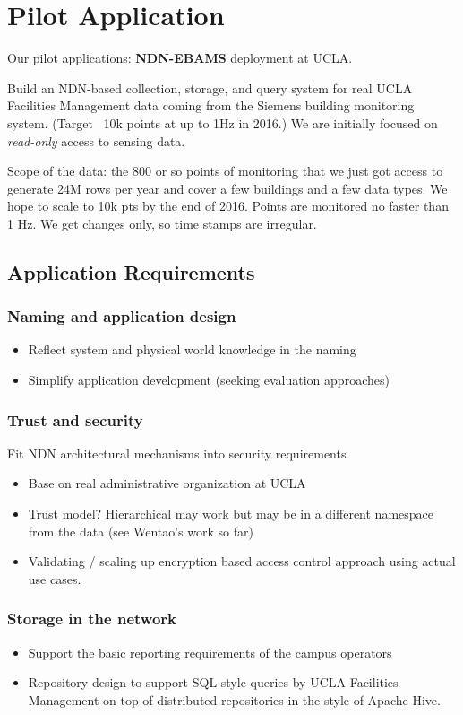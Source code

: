 \section{Pilot Application}


Our pilot applications:  \textbf{NDN-EBAMS} deployment at UCLA. 

Build an NDN-based collection, storage, and query
system for real UCLA Facilities Management data coming from the Siemens
building monitoring system. (Target ~10k points at up to 1Hz in 2016.)  We
are initially focused on \emph{read-only} access to sensing data.

Scope of the data: the 800 or so points of monitoring that we just got
access to generate 24M rows per year and cover a few buildings and a few
data types.  We hope to scale to 10k pts by the end of 2016.  Points are
monitored no faster than 1 Hz.  We get changes only, so time stamps are
irregular.



\subsection{Application Requirements}



\subsubsection{Naming and application design}
\begin{itemize}
\item Reflect system and physical world knowledge in the naming 
\item Simplify application development (seeking evaluation approaches)
\end{itemize}

\subsubsection{Trust and security}
Fit NDN architectural mechanisms into security requirements
\begin{itemize}
\item Base on real administrative organization at UCLA
\item Trust model? Hierarchical may work but may be in a different namespace from the data  (see Wentao’s work so far) 
\item Validating / scaling up encryption based access control approach using actual use cases.
\end{itemize}

\subsubsection{Storage in the network}
\begin{itemize}
\item Support the basic reporting requirements of the campus operators
\item Repository design to support SQL-style queries by UCLA Facilities Management on top of distributed repositories in the style of Apache Hive. 
\end{itemize}
